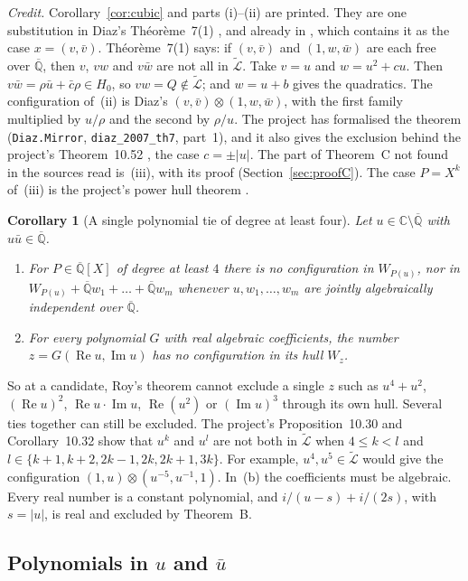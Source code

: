 \documentclass[11pt,a4paper]{article}
\theoremstyle{plain}
\newtheorem{corollary}[theorem]{Corollary}
\theoremstyle{definition}
\newcommand{\C}{\mathbb{C}}
\newcommand{\Qbar}{\overline{\mathbb{Q}}}
\newcommand{\Lt}{\widetilde{\mathcal{L}}}
\renewcommand{\Re}{\operatorname{Re}}
\renewcommand{\Im}{\operatorname{Im}}
\begin{document}
\emph{Credit.} Corollary~\ref{cor:cubic} and parts (i)--(ii) are printed. They are one
substitution in Diaz's Th\'eor\`eme~7(1) \cite{Dia07}, and already in \cite[Th.~2]{Dia04},
which contains it as the case $x=(v,\bar v)$. Th\'eor\`eme~7(1) says: if $(v,\bar v)$
and $(1,w,\bar w)$ are each free over $\Qbar$, then $v$, $vw$ and $v\bar w$ are not all in
$\Lt$. Take $v=u$ and $w=u^{2}+cu$. Then $v\bar w=\rho\bar u+\bar c\rho\in H_{0}$, so
$vw=Q\notin\Lt$; and $w=u+b$ gives the quadratics. The configuration of~(ii) is Diaz's
$(v,\bar v)\otimes(1,w,\bar w)$, with the first family multiplied by $u/\rho$ and the
second by $\rho/u$. The project has formalised the
theorem (\texttt{Diaz.Mirror}, \texttt{diaz\_2007\_th7}, part~1), and it also gives the
exclusion behind the project's Theorem~10.52 \cite{BP}, the case $c=\pm|u|$. The part
of Theorem~C not found in the sources read is~(iii), with its proof (Section~\ref{sec:proofC}). The case $P=X^{k}$ of~(iii)
is the project's power hull theorem \cite[Thm.~10.14]{BP}.

\begin{corollary}[A single polynomial tie of degree at least four]\label{cor:nogo}
Let $u\in\C\setminus\Qbar$ with $u\bar u\in\Qbar$.
\begin{enumerate}[label=\textup{(\alph*)}]
\item For $P\in\Qbar[X]$ of degree at least $4$ there is no configuration in $W_{P(u)}$,
nor in $W_{P(u)}+\Qbar w_{1}+\dots+\Qbar w_{m}$ whenever $u,w_{1},\dots,w_{m}$ are
jointly algebraically independent over $\Qbar$.
\item For every polynomial $G$ with real \emph{algebraic} coefficients, the number
$z=G(\Re u,\Im u)$ has no configuration in its hull $W_{z}$.
\end{enumerate}
\end{corollary}

So at a candidate, Roy's theorem cannot exclude a single $z$ such as $u^{4}+u^{2}$,
$(\Re u)^{2}$, $\Re u\cdot\Im u$, $\Re(u^{2})$ or $(\Im u)^{3}$ through its own hull.
Several ties together can still be excluded. The project's Proposition~10.30 and
Corollary~10.32 \cite{BP} show that $u^{k}$ and $u^{l}$ are not both in $\Lt$ when
$4\le k<l$ and $l\in\{k+1,k+2,2k-1,2k,2k+1,3k\}$. For example, $u^{4},u^{5}\in\Lt$ would
give the configuration $(1,u)\otimes(u^{-5},u^{-1},1)$. In~(b) the coefficients must be
algebraic. Every real number is a constant polynomial, and $i/(u-s)+i/(2s)$, with
$s=|u|$, is real and excluded by Theorem~B.

\subsection*{Polynomials in $u$ and $\bar u$}
\end{document}
